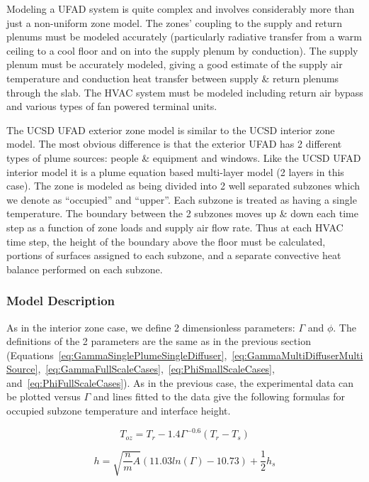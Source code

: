 {Modeling a UFAD system is quite complex and involves considerably more than just a non-uniform zone model. The zones' coupling to the supply and return plenums must be modeled accurately (particularly radiative transfer from a warm ceiling to a cool floor and on into the supply plenum by conduction). The supply plenum must be accurately modeled, giving a good estimate of the supply air temperature and conduction heat transfer between supply \& return plenums through the slab. The HVAC system must be modeled including return air bypass and various types of fan powered terminal units.

The UCSD UFAD exterior zone model is similar to the UCSD interior zone model. The most obvious difference is that the exterior UFAD has 2 different types of plume sources: people \& equipment and windows. Like the UCSD UFAD interior model it is a plume equation based multi-layer model (2 layers in this case). The zone is modeled as being divided into 2 well separated subzones which we denote as ``occupied'' and ``upper''. Each subzone is treated as having a single temperature. The boundary between the 2 subzones moves up \& down each time step as a function of zone loads and supply air flow rate. Thus at each HVAC time step, the height of the boundary above the floor must be calculated, portions of surfaces assigned to each subzone, and a separate convective heat balance performed on each subzone.

\subsubsection{Model Description}\label{model-description-2-001}

As in the interior zone case, we define 2 dimensionless parameters: \(\Gamma\) and \(\phi\). The definitions of the 2 parameters are the same as in the previous section (Equations~\ref{eq:GammaSinglePlumeSingleDiffuser},~\ref{eq:GammaMultiDiffuserMultiSource},~\ref{eq:GammaFullScaleCases},~\ref{eq:PhiSmallScaleCases}, and~\ref{eq:PhiFullScaleCases}). As in the previous case, the experimental data can be plotted versus \(\Gamma\) and lines fitted to the data give the following formulas for occupied subzone temperature and interface height.

\begin{equation}
{T_{oz}} = {T_r} - 1.4{\Gamma ^{ - 0.6}}({T_r} - {T_s})
\end{equation}

\begin{equation}
h = \sqrt {\frac{n}{m}A} (11.03ln(\Gamma ) - 10.73) + \frac{1}{2}{h_s}
\label{eq:InterfaceHeightUFAD}
\end{equation}

}
